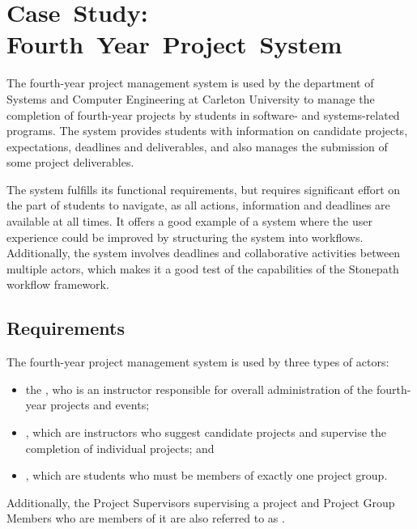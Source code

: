 \documentclass[document.tex]{subfiles}
\begin{document}
\chapter{Case~Study: Fourth~Year~Project~System}
\label {ch:case-study-1}

The fourth-year project management system is used by the department of Systems and Computer Engineering at Carleton University to manage the completion of fourth-year projects by students in software- and systems-related programs. The system provides students with information on candidate projects, expectations, deadlines and deliverables, and also manages the submission of some project deliverables.

The system fulfills its functional requirements, but requires significant effort on the part of students to navigate, as all actions, information and deadlines are available at all times. It offers a good example of a system where the user experience could be improved by structuring the system into workflows. Additionally, the system involves deadlines and collaborative activities between multiple actors, which makes it a good test of the capabilities of the Stonepath workflow framework.

\section {Requirements}
\label {sec:4ys-requirements}

The fourth-year project management system is used by three types of actors:
\begin{itemize}
\item the , who is an instructor responsible for overall administration of the fourth-year projects and events;
\item {}, which are instructors who suggest candidate projects and supervise the completion of individual projects; and
\item {}, which are students who must be members of exactly one project group.
\end{itemize}
Additionally, the Project Supervisors supervising a project and Project Group Members who are members of it are also referred to as .
\end{document}
